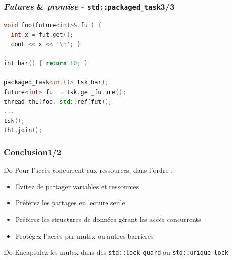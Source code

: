 \documentclass[C++.tex]{subfiles}
\begin{document}
\begin{frame}[fragile]
	\frametitle{\textit{Futures} \& \textit{promise} - \lstinline|std::packaged_task|\titlehfill{}3/3}
	\begin{lstlisting}[language=C++]
void foo(future<int>& fut) {
  int x = fut.get();
  cout << x << '\n'; }

int bar() { return 10; }

packaged_task<int()> tsk(bar);
future<int> fut = tsk.get_future();
thread th1(foo, std::ref(fut));
...
tsk();
th1.join();\end{lstlisting}
\end{frame}

\begin{frame}[fragile]
	\frametitle{Conclusion\titlehfill{}1/2}
	\begin{exampleblock}{Do}
		Pour l'accès concurrent aux ressources, dans l'ordre :
		\begin{itemize}
			\item Évitez de partager variables et ressources
			\item Préférez les partages en lecture seule
			\item Préférez les structures de données gérant les accès concurrents


			\item Protégez l'accès par mutex ou autres barrières
		\end{itemize}
	\end{exampleblock}

	\begin{exampleblock}{Do}
		Encapsulez les mutex dans des \lstinline|std::lock_guard| ou \lstinline|std::unique_lock|
	\end{exampleblock}
\end{frame}
\end{document}

